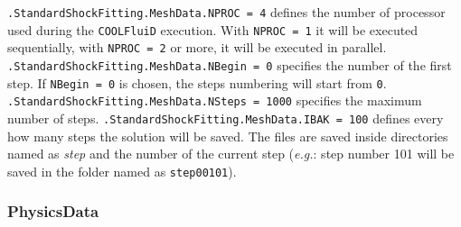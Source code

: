 \documentclass[11pt,a4paper,oneside]{article}
\begin{document}
\newline
\hspace*{1cm}  \texttt{.StandardShockFitting.MeshData.NPROC = 4}
\newline
\newline
defines the number of processor used during the \texttt{COOLFluiD} execution. 
\newline
With \texttt{NPROC = 1} it will be executed sequentially, with \texttt{NPROC = 2} or more, it will be executed in parallel.
\newline
\newline
\hspace*{1cm} \texttt{.StandardShockFitting.MeshData.NBegin = 0}
\newline
\newline
specifies the number of the first step. If \texttt{NBegin = 0} is chosen, the steps numbering will start from \texttt{0}. 
\newline
\newline
\hspace*{1cm} \texttt{.StandardShockFitting.MeshData.NSteps = 1000}
\newline
\newline
specifies the maximum number of steps.
\newline
\newline
\hspace*{1cm} \texttt{.StandardShockFitting.MeshData.IBAK = 100}
\newline
\newline
defines every how many steps the solution will be saved. The files are saved inside directories named as \textit{step} and the number of the current step (\textit{e.g.}: step number 101 will be saved in the folder named as \texttt{step00101}).

\subsubsection{PhysicsData}
\end{document}

